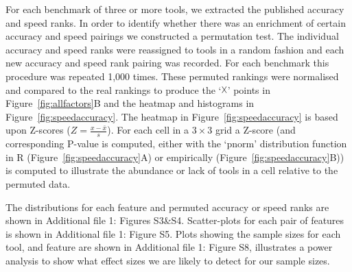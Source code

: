 \documentclass{bmcart}
\begin{document}
For each benchmark of three or more tools, we extracted the published
accuracy and speed ranks. In order to identify whether there was an
enrichment of certain accuracy and speed pairings we constructed a
permutation test. The individual accuracy and speed ranks were
reassigned to tools in a random fashion and each new accuracy and
speed rank pairing was recorded. For each benchmark this procedure was
repeated 1,000 times. These permuted rankings were normalised and
compared to the real rankings to produce the ‘$\vartimes$’ points in
Figure~\ref{fig:allfactors}B and the heatmap and histograms in
Figure~\ref{fig:speedaccuracy}. The heatmap in
Figure~\ref{fig:speedaccuracy} is based upon Z-scores
($Z=\frac{x-\bar{x}}{s}$). For each cell in a $3\times 3$ grid
a Z-score (and corresponding P-value is computed, either with the `pnorm' distribution function in R (Figure~\ref{fig:speedaccuracy}A) or empirically (Figure~\ref{fig:speedaccuracy}B)) is computed to illustrate the abundance or lack of tools in
a cell relative to the permuted data.

{\color{red} The distributions for each feature and permuted accuracy or speed ranks are shown in {\color{red} Additional file 1: Figures S3\&S4}. Scatter-plots for each pair of features is shown in {\color{red} Additional file 1: Figure S5}. Plots showing the sample sizes for each tool, and feature are shown in {\color{red} Additional file 1: Figure S8}, illustrates a power analysis to show what effect sizes we are likely to detect for our sample sizes. }
\end{document}
